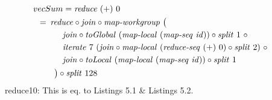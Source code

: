\begin{align}
  &\hspace{-1.5em}vecSum = \reduce\ (+)\ 0\nonumber\\
  &\hspace{-2em}\quad\begin{aligned}
    &=\hspace{.2em}
      \reduce \circ \join \circ \mapWorkgroup\ \big(\\
    &\qquad\quad \join \circ \toGlobal\ (\mapLocal\ (\mapSeq\ \id)) \circ \splitN\ 1\ \circ\\
    &\qquad\quad\iterateN\ 7\ (\join \circ \mapLocal\ (\reduceSeq\ (+)\ 0) \circ \splitN\ 2)\ \circ\\
    &\qquad\quad \join \circ \toLocal\ (\mapLocal\ (\mapSeq\ \id)) \circ \splitN\ 1\\
    &\qquad\big) \circ \splitN\ 128
  \end{aligned}
\end{align}
reduce10: This is eq. to Listings 5.1 \& Listings 5.2.











